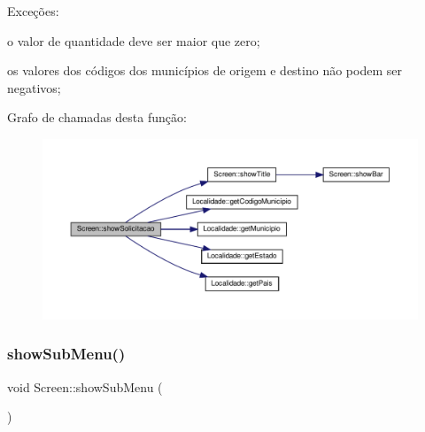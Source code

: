 Exceções\+:
\begin{DoxyItemize}
\item o valor de quantidade deve ser maior que zero;
\item os valores dos códigos dos municípios de origem e destino não podem ser negativos;
\end{DoxyItemize}Grafo de chamadas desta função\+:\nopagebreak
\begin{figure}[H]
\begin{center}
\leavevmode
\includegraphics[width=350pt]{classScreen_a2f514fb5d139b0b6e8d67c95ee6a2596_cgraph}
\end{center}
\end{figure}
\mbox{\label{classScreen_ac974e1d0dc9ab1f4c9be2d8f70d763c7}} 
\subsubsection{\texorpdfstring{show\+Sub\+Menu()}{showSubMenu()}}
{\footnotesize\ttfamily void Screen\+::show\+Sub\+Menu (\begin{DoxyParamCaption}{ }\end{DoxyParamCaption})}

